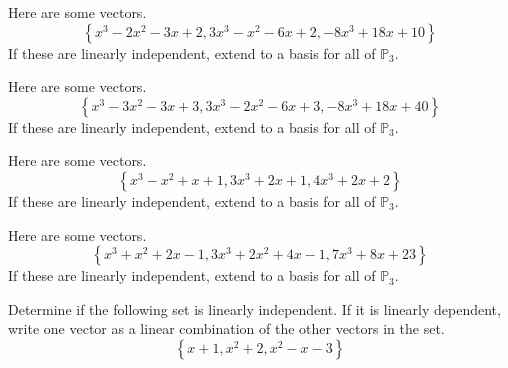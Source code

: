 \documentclass{ximera}
\begin{document}
\begin{problem}\label{prb:10.48} Here are some vectors.
\begin{equation*}
\left\{ x^{3}-2x^{2}-3x+2,3x^{3}-x^{2}-6x+2,-8x^{3}+18x+10\right\}
\end{equation*}
If these are linearly independent, extend to a basis for all of $\mathbb{P}
_{3}$.
\end{problem}


\begin{problem}\label{prb:10.49} Here are some vectors.
\begin{equation*}
\left\{ x^{3}-3x^{2}-3x+3,3x^{3}-2x^{2}-6x+3,-8x^{3}+18x+40\right\}
\end{equation*}
If these are linearly independent, extend to a basis for all of $\mathbb{P}
_{3}$.
\end{problem}


\begin{problem}\label{prb:10.50} Here are some vectors.
\begin{equation*}
\left\{ x^{3}-x^{2}+x+1,3x^{3}+2x+1,4x^{3}+2x+2\right\}
\end{equation*}
If these are linearly independent, extend to a basis for all of $\mathbb{P}
_{3}$.
\end{problem}


\begin{problem}\label{prb:10.51} Here are some vectors.
\begin{equation*}
\left\{ x^{3}+x^{2}+2x-1,3x^{3}+2x^{2}+4x-1,7x^{3}+8x+23\right\}
\end{equation*}
If these are linearly independent, extend to a basis for all of $\mathbb{P}
_{3}$.
\end{problem}


\begin{problem}\label{prb:10.52} Determine if the following set is linearly independent. If it is linearly dependent, write one vector as a linear combination of the other vectors in the set.
\[
\left\{ x+1, x^2 + 2, x^2 - x -3 \right\}
\]
\end{problem}
\end{document}
